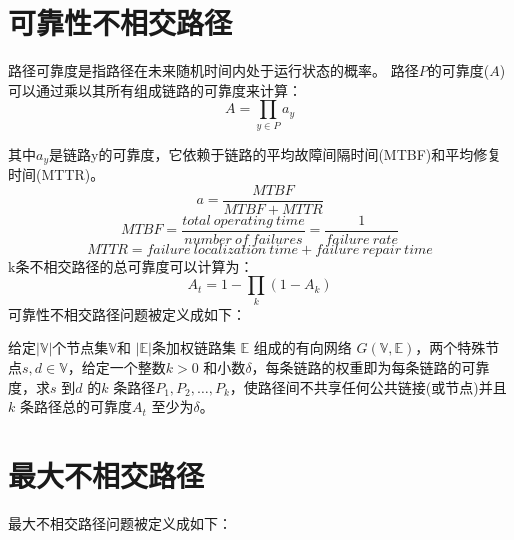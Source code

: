 \section{可靠性不相交路径}
路径可靠度是指路径在未来随机时间内处于运行状态的概率\cite{clouqueur2002availability}。 路径$P$的可靠度($A$) 可以通过乘以其所有组成链路的可靠度来计算：
\begin{equation}
A=\prod_{y\in P}a_y
\end{equation}

其中$a_y$是链路y的可靠度，它依赖于链路的平均故障间隔时间(MTBF)和平均修复时间(MTTR)。
\begin{equation}
a=\frac{MTBF}{MTBF+MTTR}
\end{equation}
\begin{equation}
MTBF=\frac{total\ operating\ time}{number\ of\ failures}=\frac{1}{failure\ rate}
\end{equation}
\begin{equation}
MTTR=failure\ localization\ time+failure\ repair\ time
\end{equation}
k条不相交路径的总可靠度可以计算为：
\begin{equation}
A_t=1-\prod_k(1-A_k)
\end{equation}
可靠性不相交路径问题被定义成如下：

\begin{definition}[可靠性不相交路径]
给定$|\mathbb{V}|$个节点集$\mathbb{V}$和 $|\mathbb{E}|$条加权链路集 $\mathbb{E}$ 组成的有向网络 $G(\mathbb{V},\mathbb{E})$，两个特殊节点$s,d\in\mathbb{V}$，给定一个整数$k>0$ 和小数$\delta$，每条链路的权重即为每条链路的可靠度，求$s$ 到$d$ 的$k$ 条路径$P_1,P_2,\ldots,P_k$，使路径间不共享任何公共链接(或节点)并且$k$ 条路径总的可靠度$A_t$ 至少为$\delta$。
\end{definition}
\section{最大不相交路径}
最大不相交路径问题被定义成如下：

